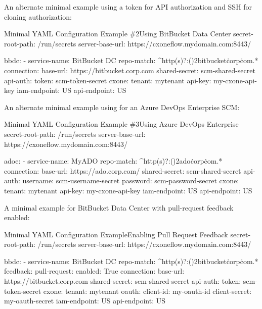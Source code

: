 \pagebreak
An alternate minimal example using a token for API authorization and SSH for cloning authorization:

\begin{code}{Minimal YAML Configuration Example \#2}{Using BitBucket Data Center}{}
secret-root-path: /run/secrets
server-base-url: https://cxoneflow.mydomain.com:8443/

bbdc:
    - service-name: BitBucket DC
      repo-match: ^http(s)?:(\/){2}bitbucket\.corp\.com.*
      connection:
      base-url: https://bitbucket.corp.com
      shared-secret: scm-shared-secret
      api-auth:
        token: scm-token-secret
      cxone:
        tenant: mytenant
        api-key: my-cxone-api-key
        iam-endpoint: US
        api-endpoint: US
\end{code}
    
\pagebreak
An alternate minimal example using for an Azure DevOps Enterprise SCM:

\begin{code}{Minimal YAML Configuration Example \#3}{Using Azure DevOps Enterprise}{}
secret-root-path: /run/secrets
server-base-url: https://cxoneflow.mydomain.com:8443/

adoe:
    - service-name: MyADO
      repo-match: ^http(s)?:(\/){2}ado\.corp\.com.*
      connection:
      base-url: https://ado.corp.com/
      shared-secret: scm-shared-secret
      api-auth:
        username: scm-username-secret
        password: scm-password-secret
      cxone:
        tenant: mytenant
        api-key: my-cxone-api-key
        iam-endpoint: US
        api-endpoint: US
\end{code}

\pagebreak
A minimal example for BitBucket Data Center with pull-request feedback enabled:

\begin{code}{Minimal YAML Configuration Example}{Enabling Pull Request Feedback}{}
secret-root-path: /run/secrets
server-base-url: https://cxoneflow.mydomain.com:8443/

bbdc:
    - service-name: BitBucket DC
      repo-match: ^http(s)?:(\/){2}bitbucket\.corp\.com.*
      feedback:
        pull-request:
          enabled: True
      connection:
        base-url: https://bitbucket.corp.com
        shared-secret: scm-shared-secret
        api-auth:
          token: scm-token-secret
      cxone:
        tenant: mytenant
        oauth:
          client-id: my-oauth-id
          client-secret: my-oauth-secret
        iam-endpoint: US
        api-endpoint: US
\end{code}

